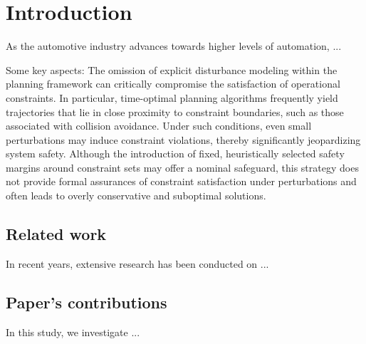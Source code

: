 \section{Introduction}
\label{sec:intro}

As the automotive industry advances towards higher levels of automation, ...

Some key aspects: The omission of explicit disturbance modeling within the planning framework can critically compromise the satisfaction of operational constraints. In particular, time-optimal planning algorithms frequently yield trajectories that lie in close proximity to constraint boundaries, such as those associated with collision avoidance. Under such conditions, even small perturbations may induce constraint violations, thereby significantly jeopardizing system safety. Although the introduction of fixed, heuristically selected safety margins around constraint sets may offer a nominal safeguard, this strategy does not provide formal assurances of constraint satisfaction under perturbations and often leads to overly conservative and suboptimal solutions.
  
\subsection{Related work}
In recent years, extensive research has been conducted on ...


\subsection{Paper's contributions}
In this study, we investigate ... 